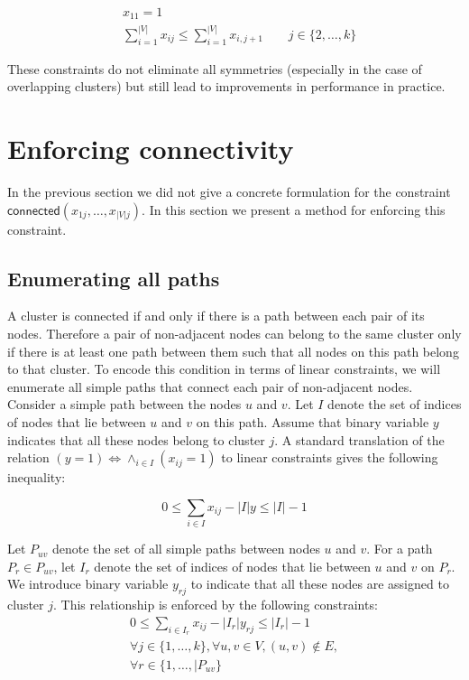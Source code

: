 \documentclass[conference,compsoc]{IEEEtran}
\begin{document}
\begin{align}
&x_{11} = 1 \\
&\sum_{i=1}^{|V|} x_{ij} \leq \sum_{i=1}^{|V|} x_{i,j+1} \qquad j \in \{2, \ldots, k\}
\end{align}

These constraints do not eliminate all symmetries (especially in the case of overlapping clusters) but still lead to improvements in performance in practice. 

\section{Enforcing connectivity}
\label{sec:connectivity}
In the previous section we did not give a concrete formulation for the constraint $\mathsf{connected}(x_{1j}, \ldots, x_{|V|j})$. In this section we present a method for enforcing this constraint.

\subsection{Enumerating all paths}
A cluster is connected if and only if there is a path between each pair of its nodes. Therefore a pair of non-adjacent nodes can belong to the same cluster only if there is at least one path between them such that all nodes on this path belong to that cluster. To encode this condition in terms of linear constraints, we will enumerate all simple paths that connect each pair of non-adjacent nodes. Consider a simple path between the nodes $u$ and $v$. Let $I$ denote the set of indices of nodes that lie between $u$ and $v$ on this path. Assume that binary variable $y$ indicates that all these nodes belong to cluster $j$. A standard translation of the relation $(y=1) \iff \land_{i \in I} (x_{ij}=1)$ to linear constraints gives the following inequality:

\begin{equation}
0 \leq \sum_{i \in I} x_{ij} - |I|y \leq |I|-1
\end{equation}

Let $P_{uv}$ denote the set of all simple paths between nodes $u$ and $v$. For a path $P_r \in P_{uv}$, let $I_r$ denote the set of indices of nodes that lie between $u$ and $v$ on $P_r$. We introduce binary variable $y_{rj}$ to indicate that all these nodes are assigned to cluster $j$. This relationship is enforced by the following constraints:
\begin{multline}
0 \leq \sum_{i\in I_r} x_{ij} - |I_r| y_{rj} \leq |I_r| - 1 \\
\forall j \in \{1, \ldots, k\}, \forall u, v \in V, (u, v) \notin E, \\ \forall r \in \{1, \ldots, |P_{uv}\}
\end{multline}
\end{document}
